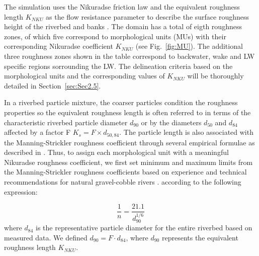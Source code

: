 \documentclass[draft,linenumbers,onecolumn]{agujournal2019} %
\begin{document}
The simulation uses the Nikuradse friction law and the equivalent roughness length \(K_{NKU}\) as the flow resistance parameter to describe the surface roughness height of the riverbed and banks \cite{nikuradse1933stroemungsgesetze,marriott2010hydraulic,webber2018fluid,hervouet2020telemac2d}. The domain has a total of eigth roughness zones, of which five correspond to morphological units (MUs) with their corresponding Nikuradse coefficient \(K_{NKU}\) (see Fig.~\ref{fig:MU}). The additional three roughness zones shown in the table correspond to backwater, wake and LW specific regions sorrounding the LW. The delineation criteria based on the morphological units and the corresponding values of \( K_{NKU} \) will be thoroughly detailed in Section~\ref{sec:Sec2.5}.


In a riverbed particle mixture, the coarser particles condition the roughness properties so the equivalent roughness length is often referred to in terms of the characteristic riverbed particle diameter \(d_{90}\) or by the diameters \(d_{50}\) and \(d_{84}\) affected by a factor F  \( K_{s} = F \times d_{50,84} \). The particle length is also associated with the Manning-Strickler roughness coefficient through several empirical formulae as described in . Thus, to assign each morphological unit with a meaningful Nikuradse roughness coefficient, we first set minimum and maximum limits from the Manning-Strickler roughness coefficients based on experience and technical recommendations for natural gravel-cobble rivers \cite{chow1959openchannel}. according to the following expression:

\begin{equation}
	\frac{1}{n} = \frac{21.1}{d_{90}^{1/6}}
	\label{eq:roughness}
\end{equation}
where \( d_{84} \) is the representative particle diameter for the entire riverbed based on measured data. We defined \( d_{90} = F \cdot d_{84} \), where \( d_{90} \) represents the equivalent roughness length \( K_{NKU} \).
 

\end{document}
